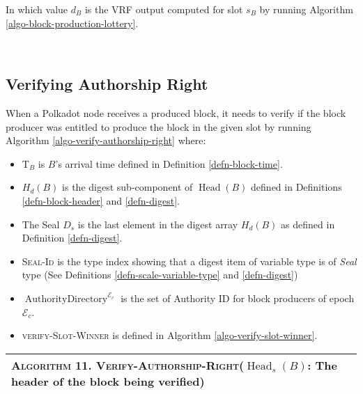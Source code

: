 \documentclass{book}
\newcommand{\tmem}[1]{{\em #1\/}}
\newcommand{\tmname}[1]{\textsc{#1}}
\newcommand{\tmop}[1]{\ensuremath{\operatorname{#1}}}
\newcommand{\tmtextit}[1]{{\itshape{#1}}}
\newcommand{\tmtextsc}[1]{{\scshape{#1}}}
\newenvironment{itemizeminus}{\begin{itemize} \renewcommand{\labelitemi}{$-$}\renewcommand{\labelitemii}{$-$}\renewcommand{\labelitemiii}{$-$}\renewcommand{\labelitemiv}{$-$}}{\end{itemize}}
\newcounter{tmcounter}
\newcommand{\custombinding}[1]{%
  \setcounter{tmcounter}{#1}%
  \addtocounter{tmcounter}{-1}%
  \refstepcounter{tmcounter}}
\providecommand{\tmem}[1]{\tmtextit{#1}}
\providecommand{\tmname}[1]{\tmtextsc{#1}}
\providecommand{\tmop}[1]{\ensuremath{\mathrm{#1}}}
\providecommand{\tmtextit}[1]{\tmtextit{#1}}
\begin{document}
\hrulefill{\medskip}

In which value $d_B$ is the VRF output computed for slot $s_B$ by running
Algorithm \ref{algo-block-production-lottery}.

\

\subsection{Verifying Authorship Right}\label{sect-verifying-authorship}

When a Polkadot node receives a produced block, it needs to verify if the
block producer was entitled to produce the block in the given slot by running
Algorithm \ref{algo-verify-authorship-right} where:
\begin{itemizeminus}
  \item T$_B$ is $B$'s arrival time defined in Definition
  \ref{defn-block-time}.
  
  \item $H_d (B)$ is the digest sub-component of $\tmop{Head} (B)$ defined in
  Definitions \ref{defn-block-header} and \ref{defn-digest}.
  
  \item The Seal $D_s$ is the last element in the digest array $H_d (B)$ as
  defined in Definition \ref{defn-digest}.
  
  \item {\tmname{Seal-Id}} is the type index showing that a digest item of
  variable type is of {\tmem{Seal}} type (See Definitions
  \ref{defn-scale-variable-type} and \ref{defn-digest})
  
  \item $\tmop{AuthorityDirectory}^{\mathcal{E}_c}$ is the set of Authority ID
  for block producers of epoch $\mathcal{E}_c$.
  
  \item {\tmname{verify-Slot-Winner}} is defined in Algorithm
  \ref{algo-verify-slot-winner}.
\end{itemizeminus}
\custombinding{11}{\noindent}\begin{tabular}{l}
  \hline
  \tmtextsc{Algorithm  11. }
  \label{algo-verify-authorship-right}{\tmname{Verify-Authorship-Right}}($\tmop{Head}_s
  (B)$: The header of the block being verified) \\
  \hline
\end{tabular}
\end{document}
